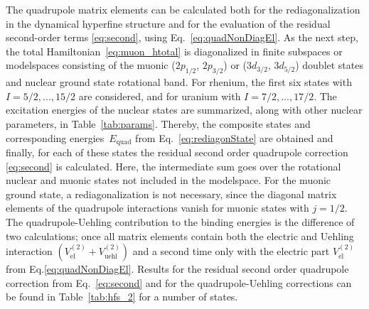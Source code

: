 The quadrupole matrix elements can be calculated both for the rediagonalization in the dynamical hyperfine structure and for the evaluation of the residual second-order terms \eqref{eq:second}, using Eq.~\eqref{eq:quadNonDiagEl}. As the next step, the total Hamiltonian~\eqref{eq:muon_htotal} is diagonalized in finite subspaces or modelspaces consisting of the muonic ($2p_{1/2}$, $2p_{3/2}$) or ($3d_{3/2}$, $3d_{5/2}$) doublet states and nuclear ground state rotational band. For rhenium, the first six states with $I =5/2,...,15/2$ are considered, and for uranium with $I =7/2,...,17/2$. The excitation energies of the nuclear states are summarized, along with other nuclear parameters, in Table~\ref{tab:params}. Thereby, the composite states and corresponding energies~$E_{\text{quad}}$ from Eq.~\eqref{eq:rediagonState} are obtained and finally, for each of these states the residual second order quadrupole correction \eqref{eq:second} is calculated. Here, the intermediate sum goes over the rotational nuclear and muonic states not included in the modelspace.
For the muonic ground state, a rediagonalization is not necessary, since the diagonal matrix elements of the quadrupole interactions vanish for muonic states with $j=1/2$.
The quadrupole-Uehling contribution to the binding energies is the difference of two calculations; once all matrix elements contain both the electric and Uehling interaction $\left({V_{\text{el}}^{(2)}}{+}{V_{\text{uehl}}^{(2)}}\right)$ and a second time only with the electric part ${V_{\text{el}}^{(2)}}$ from Eq.\eqref{eq:quadNonDiagEl}. Results for the residual second order quadrupole correction from Eq.~\eqref{eq:second} and for the quadrupole-Uehling corrections can be found in Table~\ref{tab:hfs_2} for a number of states.\\

